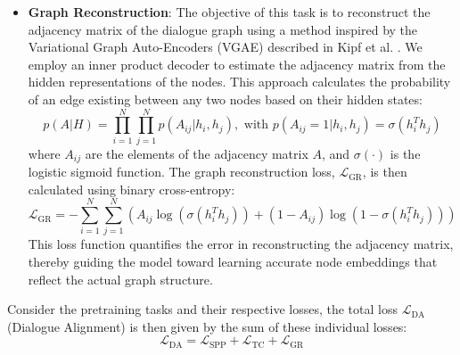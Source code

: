 \begin{itemize}
    \item \textbf{Graph Reconstruction}: The objective of this task is to reconstruct the adjacency matrix of the dialogue graph using a method inspired by the Variational Graph Auto-Encoders (VGAE) described in Kipf et al. \cite{kipf-etal-2016-vgae}. We employ an inner product decoder to estimate the adjacency matrix from the hidden representations of the nodes. This approach calculates the probability of an edge existing between any two nodes based on their hidden states:
    \begin{equation}\label{eq:vgae_inner_product}
        p(A | H) = \prod_{i=1}^{N} \prod_{j=1}^{N} p(A_{ij} | h_i, h_j), \text{ with } p(A_{ij} = 1 | h_i, h_j) = \sigma(h_i^T h_j)
    \end{equation}
    where \( A_{ij} \) are the elements of the adjacency matrix \( A \), and \( \sigma(\cdot) \) is the logistic sigmoid function. The graph reconstruction loss, \( \mathcal{L}_{\text{GR}} \), is then calculated using binary cross-entropy:
    \begin{equation}
        \mathcal{L}_{\text{GR}} = -\sum_{i=1}^N \sum_{j=1}^N \left( A_{ij} \log(\sigma(h_i^T h_j)) + (1 - A_{ij}) \log(1 - \sigma(h_i^T h_j)) \right)
    \end{equation}
    This loss function quantifies the error in reconstructing the adjacency matrix, thereby guiding the model toward learning accurate node embeddings that reflect the actual graph structure.

\end{itemize}

Consider the pretraining tasks and their respective losses, the total loss $\mathcal{L}_{\text{DA}}$ (Dialogue Alignment) is then given by the sum of these individual losses:
\begin{equation}
    \mathcal{L}_{\text{DA}} = \mathcal L_{\text{SPP}} + \mathcal L_{\text{TC}} + \mathcal L_{\text{GR}}
\end{equation}

